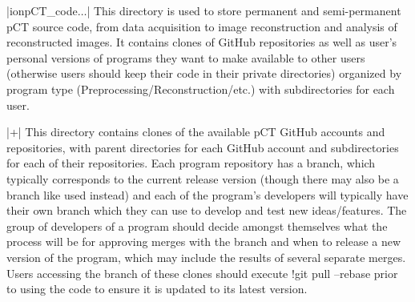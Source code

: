 \begin{tcbenvironment}
\begin{tcbparbox}|\dirsep ion\dirsep pCT\_code\dirsep $\dots$|
\bfdash This directory is used to store permanent and semi-permanent pCT source code, from data acquisition to image reconstruction and analysis of reconstructed images.  It contains clones of GitHub repositories as well as user's personal versions of programs they want to make available to other users (otherwise users should keep their code in their private directories) organized by program type (Preprocessing/Reconstruction/etc.) with subdirectories for each user.
\end{tcbparbox}
\begin{tcbparbox}|+|
\bfdash This directory contains clones of the available pCT GitHub accounts and repositories, with parent directories for each GitHub account and subdirectories for each of their repositories.  Each program repository has a  branch, which typically corresponds to the current release version (though there may also be a branch like  used instead) and each of the program's developers will typically have their own branch which they can use to develop and test new ideas/features.  The group of developers of a program should decide amongst themselves what the process will be for approving merges with the  branch and when to release a new version of the program, which may include the results of several separate merges.\\[\tcbparskip]

Users accessing the  branch of these clones should execute \tcbinlinebashbox!{git pull --rebase} prior to using the code to ensure it is updated to its latest version.\\[\tcbparskip]


\end{tcbparbox}
\end{tcbenvironment}
